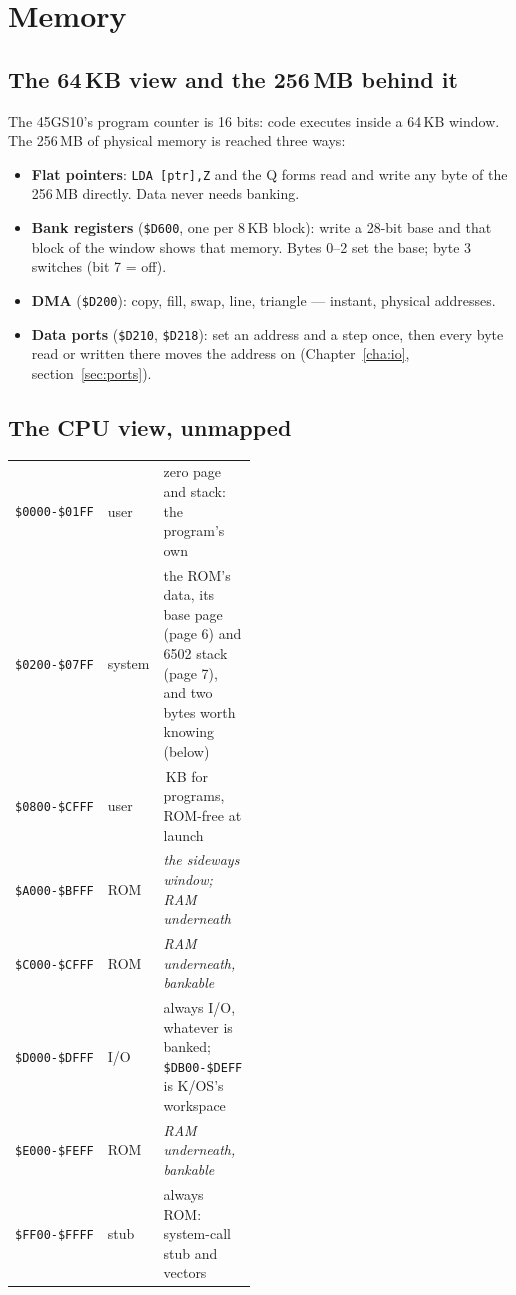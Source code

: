 \chapter{Memory}\label{cha:memory}

\section{The 64\,KB view and the 256\,MB behind it}
The 45GS10's program counter is 16 bits: code executes inside a 64\,KB
window. The 256\,MB of physical memory is reached three ways:
\begin{itemize}[leftmargin=1.4em]
\item \textbf{Flat pointers}: \verb|LDA [ptr],Z| and the Q forms read and
  write any byte of the 256\,MB directly. Data never needs banking.
\item \textbf{Bank registers} (\verb|$D600|, one per 8\,KB block): write a
  28-bit base and that block of the window shows that memory. Bytes 0--2 set
  the base; byte 3 switches (bit 7 = off).
\item \textbf{DMA} (\verb|$D200|): copy, fill, swap, line, triangle ---
  instant, physical addresses.
\item \textbf{Data ports} (\verb|$D210|, \verb|$D218|): set an address and
  a step once, then every byte read or written there moves the address on
  (Chapter~\ref{cha:io}, section~\ref{sec:ports}).
\end{itemize}

\section{The CPU view, unmapped}
\begin{center}
\small
\begin{tabular}{@{}l l >{\raggedright\arraybackslash}p{0.48\linewidth}@{}}
\toprule
\texttt{\$0000-\$01FF} & user   & zero page and stack: the program's own\\
\texttt{\$0200-\$07FF} & system & the ROM's data, its base page (page 6) and 6502 stack (page 7), and two bytes worth knowing (below)\\
\texttt{\$0800-\$CFFF} & user   & 50\,KB for programs, ROM-free at launch\\
\texttt{\$A000-\$BFFF} & ROM    & \emph{the sideways window; RAM underneath}\\
\texttt{\$C000-\$CFFF} & ROM    & \emph{RAM underneath, bankable}\\
\texttt{\$D000-\$DFFF} & I/O    & always I/O, whatever is banked; \texttt{\$DB00-\$DEFF} is K/OS's workspace\\
\texttt{\$E000-\$FEFF} & ROM    & \emph{RAM underneath, bankable}\\
\texttt{\$FF00-\$FFFF} & stub   & always ROM: system-call stub and vectors\\
\bottomrule
\end{tabular}
\end{center}

